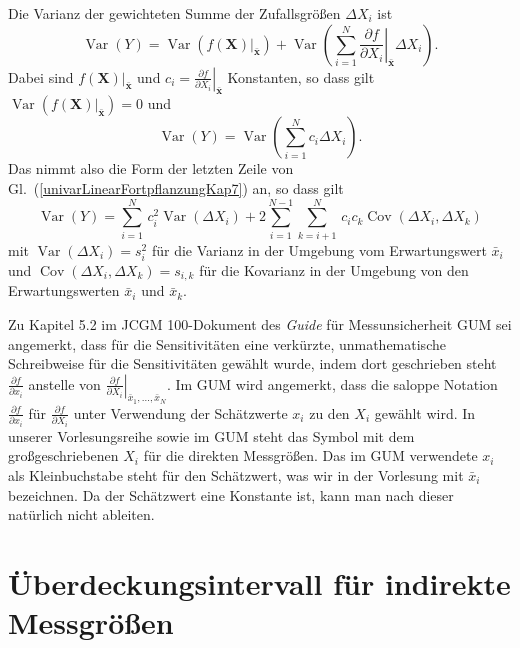 Die Varianz der gewichteten Summe der Zufallsgrößen $\Delta X_i$ ist
\begin{equation}
\operatorname{Var}(Y) 
= \operatorname{Var}\left(\left. f(\mathbf{X}) \right|_{\bar{\mathbf{x}}}\right) + 
\operatorname{Var}\left(\sum_{i=1}^N \left. \frac{\partial f}{\partial X_i} \right|_{\bar{\mathbf{x}}} \Delta X_i\right).
\end{equation}
Dabei sind $\left. f(\mathbf{X}) \right|_{\bar{\mathbf{x}}}$ und $c_i = \left. \frac{\partial f}{\partial X_i} \right|_{\bar{\mathbf{x}}}$ Konstanten, so dass gilt
$\operatorname{Var}\left(\left. f(\mathbf{X}) \right|_{\bar{\mathbf{x}}}\right) = 0$ und
\begin{equation}
\operatorname{Var}(Y) 
= \operatorname{Var}\left(\sum_{i=1}^N c_i \Delta X_i\right).
\end{equation}
Das nimmt also die Form der letzten Zeile von Gl.~(\ref{univarLinearFortpflanzungKap7}) an, so dass gilt
\begin{equation}
\operatorname {Var}\left(Y\right)
= \sum _{{i=1}}^{N} \, c_i^2 \operatorname {Var}(\Delta X_{i})+2\sum _{{i=1}}^{{N-1}}
  \sum _{{k=i+1}}^{N} \, c_i c_k \operatorname {Cov}(\Delta X_{i},\Delta X_{k})
\label{UnsicherFortpflLinearisiert}
\end{equation}
mit $\operatorname {Var}(\Delta X_{i}) = s_i^2$ für die Varianz in der Umgebung vom
Erwartungswert $\bar x_i$ und $\operatorname {Cov}(\Delta X_{i},\Delta X_{k}) = s_{i,k}$
für die Kovarianz in der Umgebung von den Erwartungswerten $\bar x_i$ und $\bar x_k$.


Zu Kapitel 5.2 im JCGM 100-Dokument des \textsl{Guide} für Messunsicherheit GUM
sei angemerkt, dass für die Sensitivitäten eine verkürzte, unmathematische Schreibweise
für die Sensitivitäten gewählt wurde, indem dort geschrieben steht $\frac{\partial f}{\partial x_i}$
anstelle von $\left. \frac{\partial f}{\partial X_i} \right|_{\bar x_1, \dots, \bar x_N}$.
Im GUM wird angemerkt, dass die saloppe Notation $\frac{\partial f}{\partial x_i}$ für 
$\frac{\partial f}{\partial X_i}$
unter Verwendung der Schätzwerte $x_i$ zu den $X_i$ gewählt wird.
In unserer Vorlesungsreihe sowie im GUM steht das Symbol mit dem großgeschriebenen $X_i$ für die
direkten Messgrößen. Das im GUM verwendete $x_i$ als Kleinbuchstabe steht für den Schätzwert,
was wir in der Vorlesung mit $\bar x_i$ bezeichnen. Da der Schätzwert eine Konstante ist,
kann man nach dieser natürlich nicht ableiten.


\section{Überdeckungsintervall für indirekte Messgrößen}

